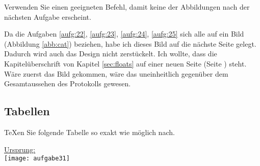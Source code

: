 \begin{aufgabe}
Verwenden Sie einen geeigneten Befehl, damit keine der Abbildungen nach der n\"achsten Aufgabe erscheint.
\end{aufgabe}
Da die Aufgaben \ref{aufg:22}, \ref{aufg:23}, \ref{aufg:24}, \ref{aufg:25} sich alle auf ein Bild (Abbildung \ref{abb:cat}) beziehen,
habe ich dieses Bild auf die nächste Seite gelegt.
Dadurch wird auch das Design nicht zerstückelt.
Ich wollte, dass die Kapitelüberschrift von Kapitel \ref{sec:floats} auf einer neuen Seite (Seite \pageref{abb:cat}) steht.
Wäre zuerst das Bild gekommen, wäre das uneinheitlich gegenüber dem Gesamtaussehen des Protokolls gewesen.

\pagebreak
\subsection{Tabellen}
\begin{aufgabe}
\TeX en Sie folgende Tabelle so exakt wie m\"oglich nach.	
\end{aufgabe}

\noindent \underline{Ursprung:} \\
\noindent\texttt{[image: aufgabe31]}

